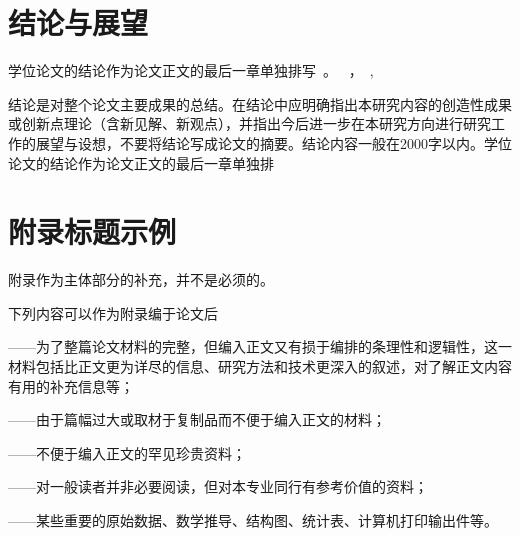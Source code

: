 \documentclass[a4paper, twoside, openany]{NCEPUDoctor}
\begin{document}
  \clearpage
  \chapter{结论与展望}

  学位论文的结论作为论文正文的最后一章单独排写~。
  ~，~, ~

  结论是对整个论文主要成果的总结。在结论中应明确指出本研究内容的创造性成果或创新点理论（含新见解、新观点），并指出今后进一步在本研究方向进行研究工作的展望与设想，不要将结论写成论文的摘要。结论内容一般在2000字以内。学位论文的结论作为论文正文的最后一章单独排

  \clearpage


  \clearpage
  
  
  \clearpage

  \appendix

  \clearpage
  \chapter{附录标题示例}

  附录作为主体部分的补充，并不是必须的。

  下列内容可以作为附录编于论文后

  ——为了整篇论文材料的完整，但编入正文又有损于编排的条理性和逻辑性，这一材料包括比正文更为详尽的信息、研究方法和技术更深入的叙述，对了解正文内容有用的补充信息等；

  ——由于篇幅过大或取材于复制品而不便于编入正文的材料；

  ——不便于编入正文的罕见珍贵资料；

  ——对一般读者并非必要阅读，但对本专业同行有参考价值的资料；

  ——某些重要的原始数据、数学推导、结构图、统计表、计算机打印输出件等。
  \clearpage

  \stopappendix

  \clearpage

\end{document}
